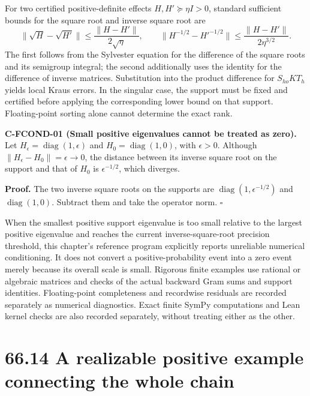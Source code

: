 \documentclass[
  11pt,
  oneside]{book}
\begin{document}
For two certified positive-definite effects \(H,H'\succeq\eta I>0\),
standard sufficient bounds for the square root and inverse square root
are \[
\|\sqrt H-\sqrt{H'}\|\le\frac{\|H-H'\|}{2\sqrt\eta},\qquad
\|H^{-1/2}-{H'}^{-1/2}\|\le
\frac{\|H-H'\|}{2\eta^{3/2}}.
\] The first follows from the Sylvester equation for the difference of
the square roots and its semigroup integral; the second additionally
uses the identity for the difference of inverse matrices. Substitution
into the product difference for \(S_{ho}KT_h\) yields local Kraus
errors. In the singular case, the support must be fixed and certified
before applying the corresponding lower bound on that support.
Floating-point sorting alone cannot determine the exact rank.

\label{c-fcond-01}{} \textbf{C-FCOND-01 (Small positive
eigenvalues cannot be treated as zero).} Let
\(H_\epsilon=\operatorname{diag}(1,\epsilon)\) and
\(H_0=\operatorname{diag}(1,0)\), with \(\epsilon>0\). Although
\(\|H_\epsilon-H_0\|=\epsilon\to0\), the distance between its inverse
square root on the support and that of \(H_0\) is \(\epsilon^{-1/2}\),
which diverges.

\textbf{Proof.} The two inverse square roots on the supports are
\(\operatorname{diag}(1,\epsilon^{-1/2})\) and
\(\operatorname{diag}(1,0)\). Subtract them and take the operator norm.
\(\square\)

When the smallest positive support eigenvalue is too small relative to
the largest positive eigenvalue and reaches the current
inverse-square-root precision threshold, this chapter's reference
program explicitly reports unreliable numerical conditioning. It does
not convert a positive-probability event into a zero event merely
because its overall scale is small. Rigorous finite examples use
rational or algebraic matrices and checks of the actual backward Gram
sums and support identities. Floating-point completeness and recordwise
residuals are recorded separately as numerical diagnostics. Exact finite
SymPy computations and Lean kernel checks are also recorded separately,
without treating either as the other.

\section{66.14 A realizable positive example connecting the whole chain}
\end{document}
